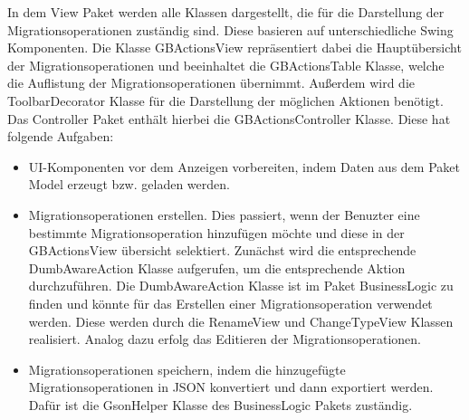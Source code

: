 	In dem View Paket werden alle Klassen dargestellt, die für die Darstellung der Migrationsoperationen zuständig sind. Diese basieren auf unterschiedliche Swing Komponenten. Die Klasse GBActionsView repräsentiert dabei die Hauptübersicht der Migrationsoperationen und beeinhaltet die GBActionsTable Klasse, welche die Auflistung der Migrationsoperationen übernimmt. Außerdem wird die ToolbarDecorator Klasse für die Darstellung der möglichen Aktionen benötigt. \\
	Das Controller Paket enthält hierbei die GBActionsController Klasse. Diese hat folgende Aufgaben:
	\begin{itemize}
		\item UI-Komponenten vor dem Anzeigen vorbereiten, indem Daten aus dem Paket Model erzeugt bzw. geladen werden.
		\item Migrationsoperationen erstellen. Dies passiert, wenn der Benuzter eine bestimmte Migrationsoperation hinzufügen möchte und diese in der GBActionsView übersicht selektiert. Zunächst wird die entsprechende DumbAwareAction Klasse aufgerufen, um die entsprechende Aktion durchzuführen. Die DumbAwareAction Klasse ist im Paket BusinessLogic zu finden und könnte für das Erstellen einer Migrationsoperation verwendet werden. Diese werden durch die RenameView und ChangeTypeView Klassen realisiert. Analog dazu erfolg das Editieren der Migrationsoperationen.
		\item Migrationsoperationen speichern, indem die hinzugefügte Migrationsoperationen in JSON konvertiert und dann exportiert werden. Dafür ist die GsonHelper Klasse des BusinessLogic Pakets zuständig.
	\end{itemize}
	
	
	
